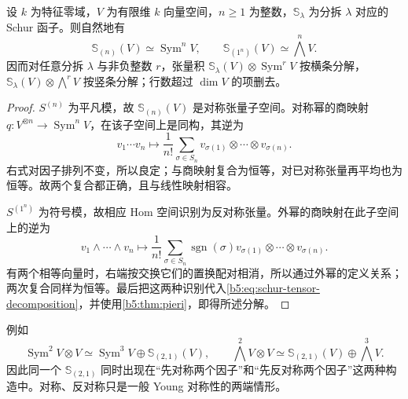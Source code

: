 \begin{proposition}\label{b5:prop:schur-symmetric-exterior}
	设 \(k\) 为特征零域，\(V\) 为有限维 \(k\) 向量空间，\(n\ge1\) 为整数，\(\mathbb S_\lambda\) 为分拆 \(\lambda\) 对应的 Schur 函子。则自然地有
	\[
		\mathbb S_{(n)}(V)\simeq\operatorname{Sym}^nV,\qquad \mathbb S_{(1^n)}(V)\simeq\bigwedge^nV.
	\]
	因而对任意分拆 \(\lambda\) 与非负整数 \(r\)，张量积 \(\mathbb S_\lambda(V)\otimes\operatorname{Sym}^rV\) 按横条分解， \(\mathbb S_\lambda(V)\otimes\bigwedge^rV\) 按竖条分解；行数超过 \(\dim V\) 的项删去。
\end{proposition}
\begin{proof}
	\(S^{(n)}\) 为平凡模，故 \(\mathbb S_{(n)}(V)\) 是对称张量子空间。对称幂的商映射 \(q:V^{\otimes n}\to\operatorname{Sym}^nV\)，在该子空间上是同构，其逆为
	\[
		v_1\cdots v_n\longmapsto \frac1{n!}\sum_{\sigma\in S_n} v_{\sigma(1)}\otimes\cdots\otimes v_{\sigma(n)}.
	\]
	右式对因子排列不变，所以良定；与商映射复合为恒等，对已对称张量再平均也为恒等。故两个复合都正确，且与线性映射相容。

	\(S^{(1^n)}\) 为符号模，故相应 Hom 空间识别为反对称张量。外幂的商映射在此子空间上的逆为
	\[
		v_1\wedge\cdots\wedge v_n\longmapsto \frac1{n!}\sum_{\sigma\in S_n}\operatorname{sgn}(\sigma) v_{\sigma(1)}\otimes\cdots\otimes v_{\sigma(n)}.
	\]
	有两个相等向量时，右端按交换它们的置换配对相消，所以通过外幂的定义关系；两次复合同样为恒等。最后把这两种识别代入\eqref{b5:eq:schur-tensor-decomposition}，并使用\cref{b5:thm:pieri}，即得所述分解。
\end{proof}

例如
\[
	\operatorname{Sym}^2V\otimes V \simeq\operatorname{Sym}^3V\oplus\mathbb S_{(2,1)}(V), \qquad \bigwedge^2V\otimes V \simeq\mathbb S_{(2,1)}(V)\oplus\bigwedge^3V.
\]
因此同一个 \(\mathbb S_{(2,1)}\) 同时出现在“先对称两个因子”和“先反对称两个因子”这两种构造中。对称、反对称只是一般 Young 对称性的两端情形。

